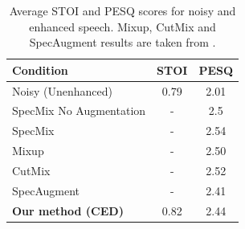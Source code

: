 \documentclass[logo,bsc,singlespacing,parskip,online]{infthesis}
\begin{document}
\begin{table}[h]
   \centering
   \begin{tabular}{l|cc}                                                                               
   \toprule
   Condition & STOI & PESQ \\
   \midrule
   Noisy (Unenhanced) & 0.79 & 2.01 \\   
   SpecMix No Augmentation \citep{kim_specmix_2021} & - & 2.5 \\
   SpecMix \citep{kim_specmix_2021} & - & 2.54 \\
   Mixup \citep{zhang_mixup_2017} & - & 2.50 \\
   CutMix \citep{yun_cutmix_2019} & - & 2.52 \\
   SpecAugment \citep{park_specaugment_2019} & - & 2.41 \\
   \textbf{Our method (CED)} & 0.82 & 2.44 \\
   \bottomrule
   \end{tabular}
   \caption{Average STOI and PESQ scores for noisy and enhanced speech. Mixup, CutMix and SpecAugment results are taken 
   from \citet{kim_specmix_2021}.}
   \label{tab:voice_enhancement_metrics}
\end{table} 
\end{document}
